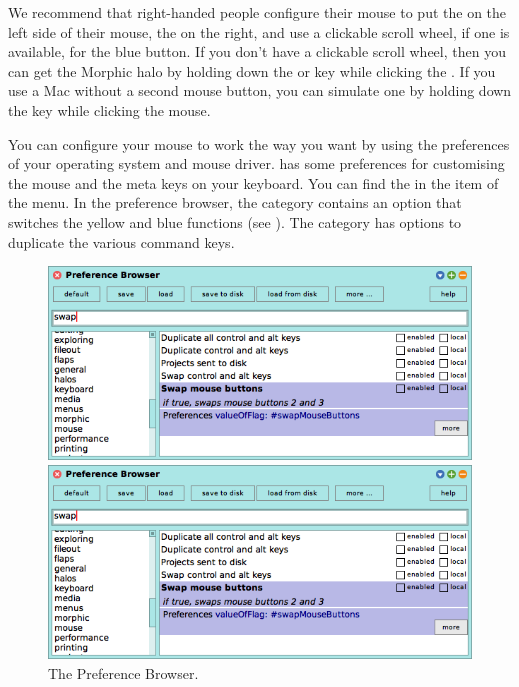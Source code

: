 \documentclass[a4paper,10pt,twoside]{book}
\begin{document}
We recommend that right-handed people configure their mouse to put the  on the left side of their mouse, the  on the right, and use a clickable scroll wheel, if one is available, for the blue button.  If you don't have a clickable scroll wheel, then you can get the Morphic halo by holding down the  or  key while clicking the .  If you use a Mac without a second mouse button, you can simulate one by holding down the \clover{} key while clicking the mouse.

You can configure your mouse to work the way you want by using the preferences of your operating system and mouse driver.
\sq has some preferences for customising the mouse and the meta keys on your keyboard. You can find the  in the  item of the  menu. 
In the preference browser, the  category contains an option  that switches the yellow and blue functions (see ).  The  category has options to duplicate the various command keys.   



\begin{figure}[htb]
\ifluluelse
	{\centerline {\includegraphics[width=\textwidth]{PreferenceBrowser}}}
	{\centerline {\includegraphics[scale=0.7]{PreferenceBrowser}}}
\caption{The Preference Browser.\label{fig:prefBrowser}}
\end{figure}
\end{document}

